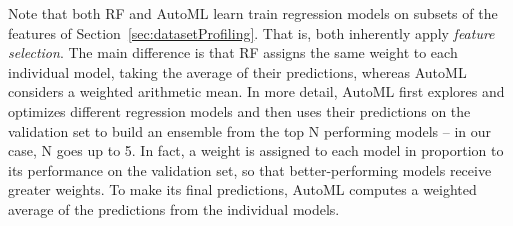 \begin{enumerate}[leftmargin=*]
\end{enumerate}

Note that both RF and AutoML learn train regression models on subsets of the features of Section~\ref{sec:datasetProfiling}. That is, both inherently apply \textit{feature selection}. The main difference is that RF assigns the same weight to each individual model, taking the average of their predictions, whereas AutoML considers a weighted arithmetic mean. In more detail,
AutoML first explores and optimizes different regression models and then uses their predictions on the validation set 
to build an ensemble from the top N performing models \cite{DBLP:conf/icml/CaruanaNCK04} -- in our case, N goes up to 5. In fact, 
a weight is assigned to each model in proportion to its performance on the validation set, so that better-performing models receive greater weights. To make its final predictions, AutoML computes a weighted average of the predictions from the individual models.
